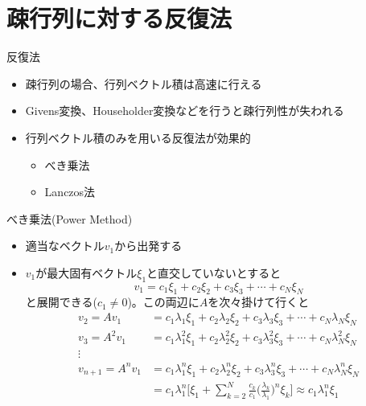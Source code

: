 \section{疎行列に対する反復法}

\begin{frame}[t,fragile]{反復法}
  \begin{itemize}
    \setlength{\itemsep}{1em}
  \item 疎行列の場合、行列ベクトル積は高速に行える
  \item Givens変換、Householder変換などを行うと疎行列性が失われる
  \item 行列ベクトル積のみを用いる反復法が効果的
    \begin{itemize}
    \item べき乗法
    \item Lanczos法
    \end{itemize}
  \end{itemize}
\end{frame}

\begin{frame}[t,fragile]{べき乗法(Power Method)}
  \begin{itemize}
  \item 適当なベクトル$v_1$から出発する
  \item $v_1$が最大固有ベクトル$\xi_1$と直交していないとすると
    \[
    v_1 = c_1 \xi_1 + c_2 \xi_2 + c_3 \xi_3 + \cdots + c_N \xi_N
    \]
    と展開できる($c_1 \ne 0$)。この両辺に$A$を次々掛けて行くと
    \begin{align*}
      v_2 = A v_1 &= c_1 \lambda_1 \xi_1 + c_2 \lambda_2 \xi_2 + c_3 \lambda_3 \xi_3 + \cdots + c_N \lambda_N \xi_N \\
      v_3 = A^2 v_1 &= c_1 \lambda_1^2 \xi_1 + c_2 \lambda_2^2 \xi_2 + c_3 \lambda_3^2 \xi_3 + \cdots + c_N \lambda_N^2 \xi_N \\
      \vdots \\
      v_{n+1} = A^n v_1 &= c_1 \lambda_1^n \xi_1 + c_2 \lambda_2^n \xi_2 + c_3 \lambda_3^n \xi_3 + \cdots + c_N \lambda_N^n \xi_N \\
      &= c_1 \lambda_1^n \Big[ \xi_1 + \sum_{k=2}^N \frac{c_k}{c_1} \big( \frac{\lambda_k}{\lambda_1}\big)^n \xi_k \Big] \approx c_1 \lambda_1^n \xi_1 \\
    \end{align*}
  \end{itemize}
\end{frame}

